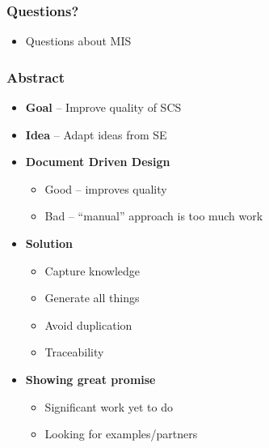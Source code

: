 \documentclass[t,12pt,numbers,fleqn]{beamer}
\begin{document}



\begin{frame}
\frametitle{Questions?}
\begin{itemize}
\item Questions about MIS
\end{itemize}
\end{frame}


\begin{frame}

\frametitle{Abstract}

\begin{itemize}
\item \textbf{Goal} -- Improve quality of SCS
\item \textbf{Idea} -- Adapt ideas from SE
\item \textbf{Document Driven Design}
\begin{itemize}
\item Good -- improves quality
\item Bad -- ``manual'' approach is too much work
\end{itemize}
\item \textbf{Solution}
\begin{itemize}
\item Capture knowledge
\item Generate all things
\item Avoid duplication
\item Traceability
\end{itemize}
\item \textbf{Showing great promise}
\begin{itemize}
\item Significant work yet to do
\item Looking for examples/partners
\end{itemize}
\end{itemize}

\end{frame}
\end{document}
